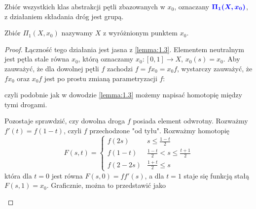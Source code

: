 \begin{theorem}[$\Pi_1(X, x_0)$]\label{twierdzenie:1.4}
  Zbiór wszystkich klas abstrakcji pętli zbazowanych w $x_0$, oznaczany $\color{blue}\boldsymbol{\Pi_1(X, x_0)}$, z działaniem składania dróg jest grupą. 
\end{theorem}

Zbiór $\Pi_1(X, x_0)$ nazywamy  $X$ z wyróżnionym punktem $x_0$.

\begin{proof}
  Łączność tego działania jest jasna z \ref{lemma:1.3}. Elementem neutralnym jest pętla stale równa $x_0$, którą oznaczamy $x_0:[0,1]\to X$, $x_0(s)=x_0$. Aby zauważyć, że dla dowolnej pętli $f$ zachodzi $f=fx_0=x_0f$, wystarczy zauważyć, że $fx_0$ oraz $x_0f$ jest po prostu zmianą parametryzacji $f$:
  \begin{center}
  \end{center}
  czyli podobnie jak w dowodzie \ref{lemma:1.3} możemy napisać homotopię między tymi drogami.

  Pozostaje sprawdzić, czy dowolna droga $f$ posiada element odwrotny. Rozważmy $f'(t)=f(1-t)$, czyli $f$ przechodzone "od tyłu". Rozważmy homotopię 
  $$F(s, t)=\begin{cases}
    f(2s) & s\leq \frac{1-t}{2}\\ 
    f(1-t) & \frac{1-t}{2}<s\leq \frac{t+1}{2}\\ 
    f(2-2s) & \frac{1+t}{2}\leq s
  \end{cases}$$
  która dla $t=0$ jest równa $F(s, 0)=ff'(s)$, a dla $t=1$ staje się funkcją stałą $F(s, 1)=x_0$. Graficznie, można to przedstawić jako
  \begin{center}
  \end{center}
\end{proof}


